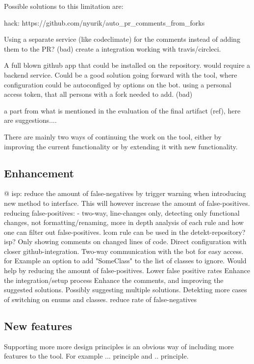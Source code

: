 \documentclass{report}
\begin{document}
Possible solutions to this limitation are: 

hack: https://github.com/nyurik/auto_pr_comments_from_forks

Using a separate service (like codeclimate) for the comments instead of adding them to the PR? (bad)
create a integration working with travis/circleci.

A full blown github app that could be installed on the repository. would require a backend service. Could be a good solution going forward with the tool, where configuration could be autoconfiged by options on the bot.
using a personal access token, that all persons with a fork needed to add. (bad)


\label{futurework}
a part from what is mentioned in the evaluation of the final artifact (ref), here are suggestions....

There are mainly two ways of continuing the work on the tool, either by improving the current functionality or by extending it with new functionality. 

\subsection{Enhancement}@
isp: reduce the amount of false-negatives by trigger warning when introducing new method to interface. This will however increase the amount of false-positives.
reducing false-positives: - two-way, line-changes only, detecting only functional changes, not formatting/renaming, more in depth analysis of each rule and how one can filter out false-positives.  
lcom rule can be used in the detekt-repository? isp?
Only showing comments on changed lines of code. 
Direct configuration with closer github-integration. Two-way communication with the bot for easy access. for Example an option to add "SomeClass" to the list of classes to ignore. Would help by reducing the amount of false-positives.
Lower false positive rates
Enhance the integration/setup process
Enhance the comments, and improving the suggested solutions. Possibly suggesting multiple solutions.
Detekting more cases of switching on enums and classes. reduce rate of false-negatives
\subsection{New features}
Supporting more more design principles is an obvious way of including more features to the tool. For example ... principle and .. principle. 
\end{document}
